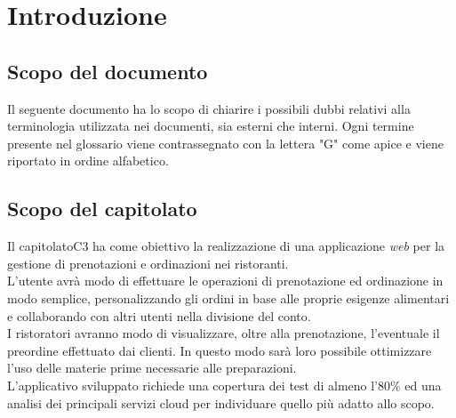 \section{Introduzione}
\subsection{Scopo del documento}
Il seguente documento ha lo scopo di chiarire i possibili dubbi relativi alla terminologia utilizzata nei documenti, sia esterni che interni.
Ogni termine presente nel glossario viene contrassegnato con la lettera "G" come apice e viene riportato in ordine alfabetico. \\


\subsection{Scopo del capitolato}
Il capitolato\g C3 ha come obiettivo la realizzazione di una applicazione \textit{web} per la gestione di prenotazioni e ordinazioni nei ristoranti. \\
L'utente avrà modo di effettuare le operazioni di prenotazione ed ordinazione in modo semplice, personalizzando gli ordini in base alle proprie esigenze alimentari e collaborando con altri utenti nella divisione del conto. \\
I ristoratori avranno modo di visualizzare, oltre alla prenotazione, l'eventuale il preordine effettuato dai clienti. 
In questo modo sarà loro possibile ottimizzare l'uso delle materie prime necessarie alle preparazioni. \\
L'applicativo sviluppato richiede una copertura dei test di almeno l'$80\%$ ed una analisi dei principali servizi cloud per individuare quello più adatto allo scopo.